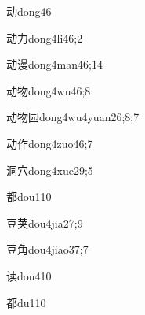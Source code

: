 \begin{verbete}{动}{dong4}{6}
\end{verbete}

\begin{verbete}{动力}{dong4li4}{6;2}
\end{verbete}

\begin{verbete}{动漫}{dong4man4}{6;14}
\end{verbete}

\begin{verbete}{动物}{dong4wu4}{6;8}
\end{verbete}

\begin{verbete}{动物园}{dong4wu4yuan2}{6;8;7}
\end{verbete}

\begin{verbete}{动作}{dong4zuo4}{6;7}
\end{verbete}

\begin{verbete}{洞穴}{dong4xue2}{9;5}
\end{verbete}

\begin{verbete}{都}{dou1}{10}
\end{verbete}

\begin{verbete}{豆荚}{dou4jia2}{7;9}
\end{verbete}

\begin{verbete}{豆角}{dou4jiao3}{7;7}
\end{verbete}

\begin{verbete}{读}{dou4}{10}
\end{verbete}

\begin{verbete}{都}{du1}{10}
\end{verbete}

